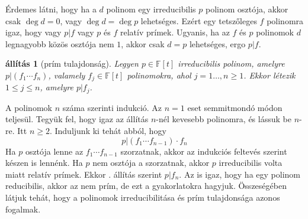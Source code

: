 \documentclass[9pt, a4paper, showtrims]{memoir}
\makeatletter
\renewenvironment{proof}[1][\proofname]
    {\par\pushQED{\qed}%
    \normalfont \topsep6\p@\@plus6\p@\relax
    \trivlist
    \item[\hskip\labelsep
        \itshape
    #1\@addpunct{:}]\ignorespaces}
    {\popQED\endtrivlist\@endpefalse}
\theoremstyle{plain}
\newtheorem{proposition}{állítás}[chapter]
\theoremstyle{remark}
\theoremstyle{definition}
\makeatother
\begin{document}
Érdemes látni,
hogy ha a $d$ polinom egy irreducibilis $p$ polinom osztója,
akkor csak
$\deg d=0$, vagy $\deg d=\deg p$ lehetséges.
Ezért egy tetszőleges $f$ polinomra igaz, hogy
vagy $p|f$ vagy $p$ és $f$ relatív prímek.
Ugyanis,
ha az $f$ és $p$ polinomok $d$ legnagyobb közös osztója nem $1$,
akkor csak $d=p$ lehetséges, ergo $p|f$.
\begin{proposition}[prím tulajdonság]
	Legyen $p\in\mathbb{F}\left[ t \right]$ irreducibilis polinom, amelyre
	$p|(f_1\cdots f_n)$, valamely $f_j\in\mathbb{F}\left[ t \right]$ polinomokra, ahol $j=1\dots,n\geq 1$.
	Ekkor létezik $1\leq j\leq n$, amelyre $p|f_j$.\qedhere
\end{proposition}
\begin{proof}
	A polinomok $n$ száma szerinti indukció.
	Az $n=1$ eset semmitmondó módon teljesül.
	Tegyük fel, hogy igaz az állítás $n$-nél kevesebb polinomra,
	és lássuk be $n$-re. Itt $n\geq 2$.
	Induljunk ki tehát abból, hogy
	\[
		p|\left( f_1\cdots f_{n-1} \right)\cdot f_n
	\]
	Ha $p$ osztója lenne az $f_1\cdots f_{n-1}$ szorzatnak,
	akkor az indukciós feltevés szerint készen is lennénk.
	Ha $p$ nem osztója a szorzatnak,
	akkor $p$ irreducibilis volta miatt relatív prímek.
	Ekkor . állítás szerint $p|f_n$.
\end{proof}
Az is igaz, hogy ha egy polinom reducibilis, akkor az nem prím, de ezt a gyakorlatokra hagyjuk.
Összeségében látjuk tehát,
hogy a polinomok irreducibilitása és prím tulajdonsága azonos fogalmak.
\end{document}
